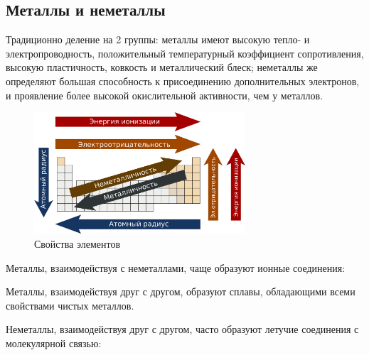 \subsection{Металлы и неметаллы}
 
Традиционно деление на 2 группы: металлы имеют высокую тепло- и электропроводность, положительный температурный коэффициент сопротивления, высокую пластичность, ковкость и металлический блеск; неметаллы же определяют большая способность к присоединению дополнительных электронов, и проявление более высокой окислительной активности, чем у металлов.

\begin{figure}[H]
    \centering
    \includegraphics[width = 0.7\textwidth]{TeX/Pictures/2_properties.png}
    \caption{Свойства элементов}
    \label{fig:2properties}
\end{figure}

Металлы, взаимодействуя с неметаллами, чаще образуют ионные соединения:


Металлы, взаимодействуя друг с другом, образуют сплавы, обладающими всеми свойствами чистых металлов.

Неметаллы, взаимодействуя друг с другом, часто образуют летучие соединения с молекулярной связью:


